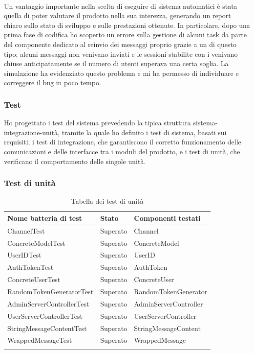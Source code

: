 		\paragraph*{}
		Un vantaggio importante nella scelta di eseguire  di sistema automatici è stata quella di poter valutare il prodotto nella sua interezza, generando un report chiaro sullo stato di sviluppo e sulle prestazioni ottenute. In particolare, dopo una prima fase di codifica ho scoperto un errore sulla gestione di alcuni task da parte del componente dedicato al reinvio dei messaggi proprio grazie a un  di questo tipo; alcuni messaggi non venivano inviati e le sessioni stabilite con i  venivano chiuse anticipatamente se il numero di utenti superava una certa soglia. La simulazione ha evidenziato questo problema e mi ha permesso di individuare e correggere il bug in poco tempo.
		
		\subsubsection{Test}
		Ho progettato i test del sistema prevedendo la tipica struttura sistema-integrazione-unità, tramite la quale ho definito i test di sistema, basati sui requisiti; i test di integrazione, che garantiscono il corretto funzionamento delle comunicazioni e delle interfacce tra i moduli del prodotto, e i test di unità, che verificano il comportamento delle singole unità.

		\subsubsection{Test di unità}
		\begin{longtable}{ p{} p{} p{} }			
			\toprule
			\textbf{Nome batteria di test} & \textbf{Stato} & \textbf{Componenti testati} \\
			\midrule
			ChannelTest 					& Superato  & Channel 					\\ 
			ConcreteModelTest 			& Superato 	& ConcreteModel 			\\
			UserIDTest 						& Superato 	& UserID 					\\
			AuthTokenTest 					& Superato 	& AuthToken 				\\
			ConcreteUserTest 				& Superato 	& ConcreteUser 			\\
			RandomTokenGeneratorTest 	& Superato 	& RandomTokenGenerator 	\\
			AdminServerControllerTest 	& Superato 	& AdminServerController \\
			UserServerControllerTest 	& Superato  & UserServerController 	\\ 			  
			StringMessageContentTest 	& Superato  & StringMessageContent 	\\ 
			WrappedMessageTest 			& Superato 	& WrappedMessage 			\\
			\caption{Tabella dei test di unità}	
		\end{longtable}

